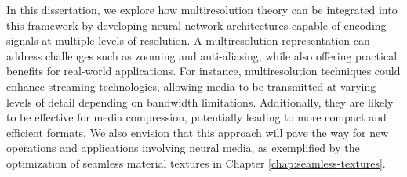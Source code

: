 In this dissertation, we explore how multiresolution theory can be integrated into this framework by developing neural network architectures capable of encoding signals at multiple levels of resolution. A multiresolution representation can address challenges such as zooming and anti-aliasing, while also offering practical benefits for real-world applications. For instance, multiresolution techniques could enhance streaming technologies, allowing media to be transmitted at varying levels of detail depending on bandwidth limitations. Additionally, they are likely to be effective for media compression, potentially leading to more compact and efficient formats. We also envision that this approach will pave the way for new operations and applications involving neural media, as exemplified by the optimization of seamless material textures in Chapter \ref{chap:seamless-textures}. 









